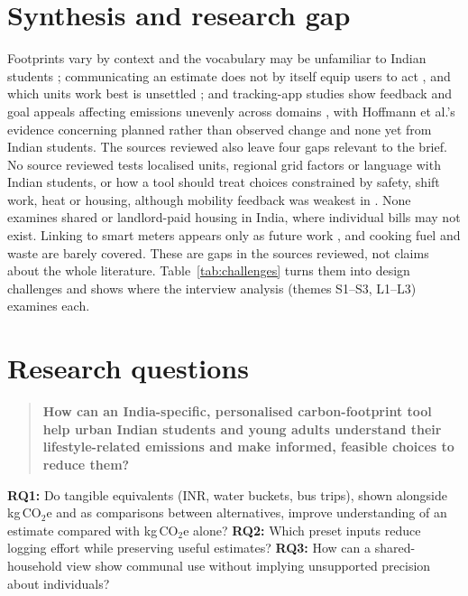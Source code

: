 \documentclass[10pt,a4paper,twocolumn]{article}
\begin{document}
\section{Synthesis and research gap}
Footprints vary by context and the vocabulary may be unfamiliar to Indian students \cite{lee2021,gandhi2025,grinstein2018}; communicating an estimate does not by itself equip users to act \cite{mulrow2019,collins2020}, and which units work best is unsettled \cite{mohanty2023}; and tracking-app studies show feedback and goal appeals affecting emissions unevenly across domains \cite{hoffmann2024,lasarov2024}, with Hoffmann et al.'s evidence concerning planned rather than observed change and none yet from Indian students. The sources reviewed also leave four gaps relevant to the brief. No source reviewed tests localised units, regional grid factors or language with Indian students, or how a tool should treat choices constrained by safety, shift work, heat or housing, although mobility feedback was weakest in \cite{hoffmann2024}. None examines shared or landlord-paid housing in India, where individual bills may not exist. Linking to smart meters appears only as future work \cite{hoffmann2024}, and cooking fuel and waste are barely covered. These are gaps in the sources reviewed, not claims about the whole literature. Table~\ref{tab:challenges} turns them into design challenges and shows where the interview analysis (themes S1--S3, L1--L3) examines each.

\section{Research questions}
\begin{quote}
\small
\textbf{How can an India-specific, personalised carbon-footprint tool help urban Indian students and young adults understand their lifestyle-related emissions and make informed, feasible choices to reduce them?}
\end{quote}
\textbf{RQ1:} Do tangible equivalents (INR, water buckets, bus trips), shown alongside kg\,CO$_2$e and as comparisons between alternatives, improve understanding of an estimate compared with kg\,CO$_2$e alone? \textbf{RQ2:} Which preset inputs reduce logging effort while preserving useful estimates? \textbf{RQ3:} How can a shared-household view show communal use without implying unsupported precision about individuals?
\end{document}
